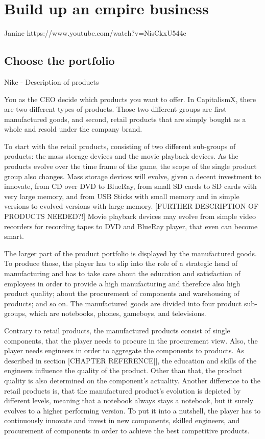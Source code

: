 \documentclass[11pt,titlepage,oneside,openany]{book}
\begin{document}
\section{Build up an empire business}
Janine
\label{sec:business}
https://www.youtube.com/watch?v=NisCkxU544c
\subsection{Choose the portfolio}
Nike - Description of products 

You as the CEO decide which products you want to offer. In CapitalismX, there are two different types of products. Those two different groups are first manufactured goods, and second, retail products that are simply bought as a whole and resold under the company brand.

To start with the retail products, consisting of two different sub-groups of products: the mass storage devices and the movie playback devices. As the products evolve over the time frame of the game, the scope of the single product group also changes. Mass storage devices will evolve, given a decent investment to innovate, from CD over DVD to BlueRay, from small SD cards to SD cards with very large memory, and from USB Sticks with small memory and in simple versions to evolved versions with large memory. [FURTHER DESCRIPTION OF PRODUCTS NEEDED?!] Movie playback devices may evolve from simple video recorders for recording tapes to DVD and BlueRay player, that even can become smart. 

The larger part of the product portfolio is displayed by the manufactured goods. To produce those, the player has to slip into the role of a strategic head of manufacturing and has to take care about the education and satisfaction of employees in order to provide a high manufacturing and therefore also high product quality; about the procurement of components and warehousing of products; and so on.
The manufactured goods are divided into four product sub-groups, which are notebooks, phones, gameboys, and televisions. 

Contrary to retail products, the manufactured products consist of single components, that the player needs to procure in the procurement view. Also, the player needs engineers in order to aggregate the components to products. As described in section [CHAPTER REFERENCE]], the education and skills of the engineers influence the quality of the product. Other than that, the product quality is also determined on the component's actuality. Another difference to the retail products is, that the manufactured product's evolution is depicted by different levels, meaning that a notebook always stays a notebook, but it surely evolves to a higher performing version. To put it into a nutshell, the player has to continuously innovate and invest in new components, skilled engineers, and procurement of components in order to achieve the best competitive products. 
\end{document}
